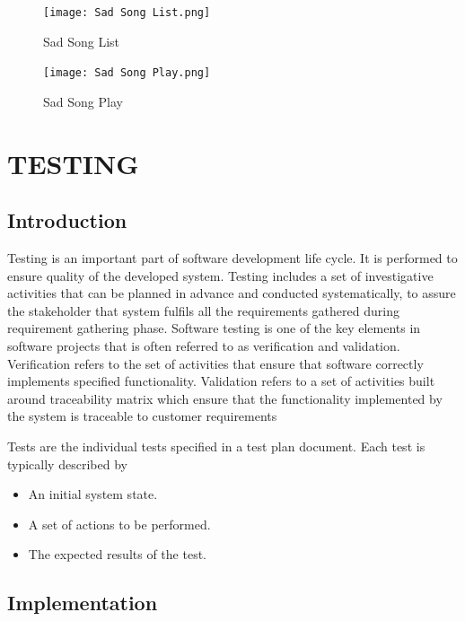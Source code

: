 \documentclass[12pt]{report}
\begin{document}
\vspace{1.5cm}
\begin{figure}[h]
\centering
\texttt{[image:  Sad Song List.png]}
\caption{  Sad Song List
}
\label{Sad Song List
}
\end{figure}

\vspace{1cm}
\begin{figure}[h]
\centering
\texttt{[image:  Sad Song Play.png]}
\caption{Sad Song Play
}
\label{Sad Song Play
}
\end{figure}
\clearpage
\centering
\section{TESTING}
\justifying
\setlength{\parindent}{4em}
\setlength{\parskip}{0.5em}
\renewcommand{\baselinestretch}{1.5}
\normalsize
\subsection{ Introduction}
\hspace{1.7 cm}Testing is an important part of software development life cycle. It is performed to ensure 
quality of the developed system. Testing includes a set of investigative activities that can be 
planned in advance and conducted systematically, to assure the stakeholder that system 
fulfils all the requirements gathered during requirement gathering phase. Software testing is 
one of the key elements in software projects that is often referred to as verification and 
validation. Verification refers to the set of activities that ensure that software correctly 
implements specified functionality. Validation refers to a set of activities built around 
traceability matrix which ensure that the functionality implemented by the system is 
traceable to customer requirements

Tests are the individual tests specified in a test plan document. Each test is typically 
described by
\begin{itemize}
\item An initial system state.
\item A set of actions to be performed.
\item The expected results of the test.
\end{itemize}

\subsection{ Implementation}
\justifying
\setlength{\parindent}{4em}
\setlength{\parskip}{0.5em}
\renewcommand{\baselinestretch}{1.5}
\normalsize
\end{document}

